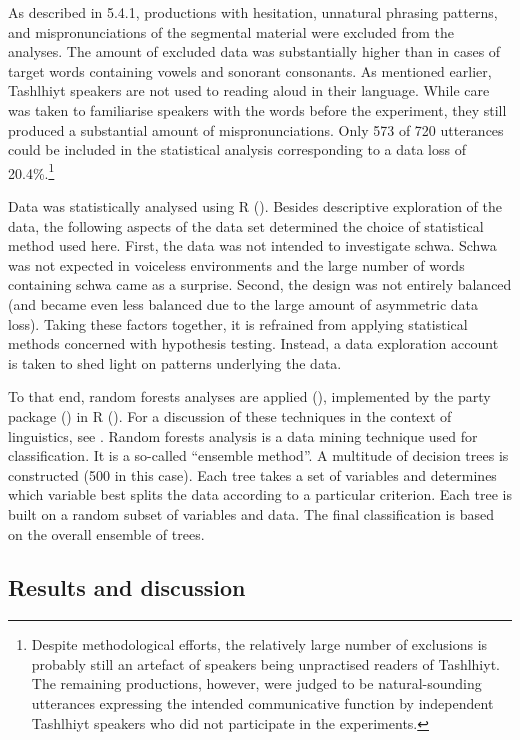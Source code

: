As described in 5.4.1, productions with hesitation, unnatural phrasing patterns, and mispronunciations of the segmental material were excluded from the analyses. The amount of excluded data was substantially higher than in cases of target words containing vowels and sonorant consonants. As mentioned earlier, Tashlhiyt speakers are not used to reading aloud in their language. While care was taken to familiarise speakers with the words before the experiment, they still produced a substantial amount of mispronunciations. Only 573 of 720 utterances could be included in the statistical analysis corresponding to a data loss of 20.4\%.\footnote{Despite methodological efforts, the relatively large number of exclusions is probably still an artefact of speakers being unpractised readers of Tashlhiyt. The remaining productions, however, were judged to be natural-sounding utterances expressing the intended communicative function by independent Tashlhiyt speakers who did not participate in the experiments.}

Data was statistically analysed using R (\citealt{R}). Besides descriptive exploration of the data, the following aspects of the data set determined the choice of statistical method used here. First, the data was not intended to investigate schwa. Schwa was not expected in voiceless environments and the large number of words containing schwa came as a surprise. Second, the design was not entirely balanced (and became even less balanced due to the large amount of asymmetric data loss). Taking these factors together, it is refrained from applying statistical methods concerned with hypothesis testing. Instead, a data exploration account is taken to shed light on patterns underlying the data. 

To that end, random forests analyses are applied (\citealt{Breiman2001}), implemented by the party package (\citealt{Hothorn.etal2006,Strobl.etal2007,Strobl.etal2008}) in R (\citealt{R}). For a discussion of these techniques in the context of linguistics, see \citet{TaglBaayen2012}. Random forests analysis is a data mining technique used for classification. It is a so-called “ensemble method”. A multitude of decision trees is constructed (500 in this case). Each tree takes a set of variables and determines which variable best splits the data according to a particular criterion. Each tree is built on a random subset of variables and data. The final classification is based on the overall ensemble of trees. 

\subsection{Results and discussion}
